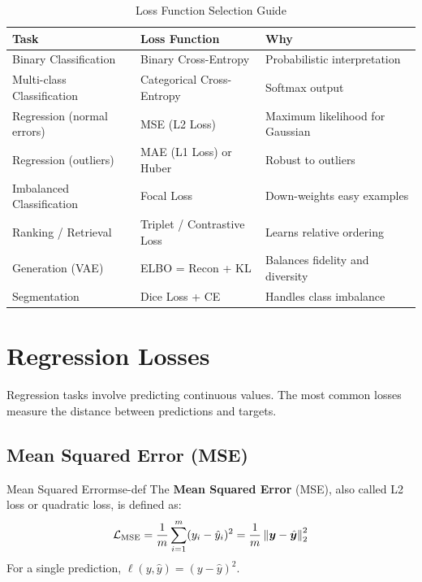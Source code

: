 \documentclass[../../main.tex]{subfiles}
\begin{document}
\begin{table}[htbp]
\centering
\caption{Loss Function Selection Guide}
\label{tab:loss-selection-guide}
\begin{tabular}{@{}lll@{}}
\toprule
\textbf{Task} & \textbf{Loss Function} & \textbf{Why} \\
\midrule
Binary Classification & Binary Cross-Entropy & Probabilistic interpretation \\
Multi-class Classification & Categorical Cross-Entropy & Softmax output \\
Regression (normal errors) & MSE (L2 Loss) & Maximum likelihood for Gaussian \\
Regression (outliers) & MAE (L1 Loss) or Huber & Robust to outliers \\
Imbalanced Classification & Focal Loss & Down-weights easy examples \\
Ranking / Retrieval & Triplet / Contrastive Loss & Learns relative ordering \\
Generation (VAE) & ELBO = Recon + KL & Balances fidelity and diversity \\
Segmentation & Dice Loss + CE & Handles class imbalance \\
\bottomrule
\end{tabular}
\end{table}

\section{Regression Losses}
\label{sec:regression-losses}

Regression tasks involve predicting continuous values. The most common losses measure the distance between predictions and targets.

\subsection{Mean Squared Error (MSE)}

\begin{definition}{Mean Squared Error}{mse-def}
The \textbf{Mean Squared Error} (MSE), also called L2 loss or quadratic loss, is defined as:
\[
    \mathcal{L}_{\text{MSE}} = \frac{1}{m} \sum_{i=1}^{m} (y_i - \hat{y}_i)^2 = \frac{1}{m} \left\lVert \boldsymbol{y} - \hat{\boldsymbol{y}} \right\rVert_2^2
\]
For a single prediction, $\ell(y, \hat{y}) = (y - \hat{y})^2$.
\end{definition}
\end{document}
